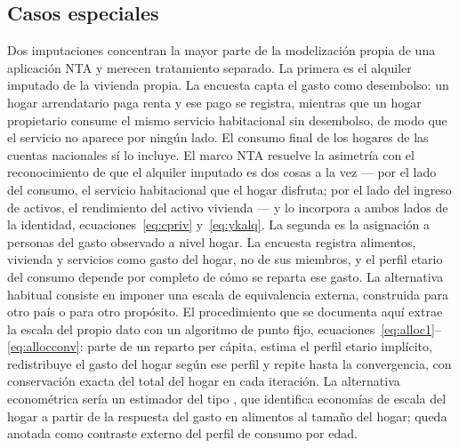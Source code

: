 \documentclass[11pt,a4paper]{article}
\begin{document}
\subsection{Casos especiales}
Dos imputaciones concentran la mayor parte de la modelización propia de una aplicación NTA y
merecen tratamiento separado. La primera es el alquiler imputado de la vivienda propia. La
encuesta capta el gasto como desembolso: un hogar arrendatario paga renta y ese pago se
registra, mientras que un hogar propietario consume el mismo servicio habitacional sin
desembolso, de modo que el servicio no aparece por ningún lado. El consumo final de los hogares
de las cuentas nacionales sí lo incluye. El marco NTA resuelve la asimetría con el
reconocimiento de que el alquiler imputado es dos cosas a la vez --- por el lado del consumo, el
servicio habitacional que el hogar disfruta; por el lado del ingreso de activos, el rendimiento
del activo vivienda --- y lo incorpora a ambos lados de la identidad, ecuaciones~\eqref{eq:cpriv}
y~\eqref{eq:ykalq}.
La segunda es la asignación a personas del gasto observado a nivel hogar. La encuesta registra
alimentos, vivienda y servicios como gasto del hogar, no de sus miembros, y el perfil etario del
consumo depende por completo de cómo se reparta ese gasto. La alternativa habitual consiste en
imponer una escala de equivalencia externa, construida para otro país o para otro propósito. El
procedimiento que se documenta aquí extrae la escala del propio dato con un algoritmo de punto
fijo, ecuaciones~\eqref{eq:alloc1}--\eqref{eq:allocconv}: parte de un reparto per cápita, estima
el perfil etario implícito, redistribuye el gasto del hogar según ese perfil y repite hasta la
convergencia, con conservación exacta del total del hogar en cada iteración. La alternativa
econométrica sería un estimador del tipo \citet{deaton_paxson_1998}, que identifica economías de
escala del hogar a partir de la respuesta del gasto en alimentos al tamaño del hogar; queda
anotada como contraste externo del perfil de consumo por edad.
\end{document}
